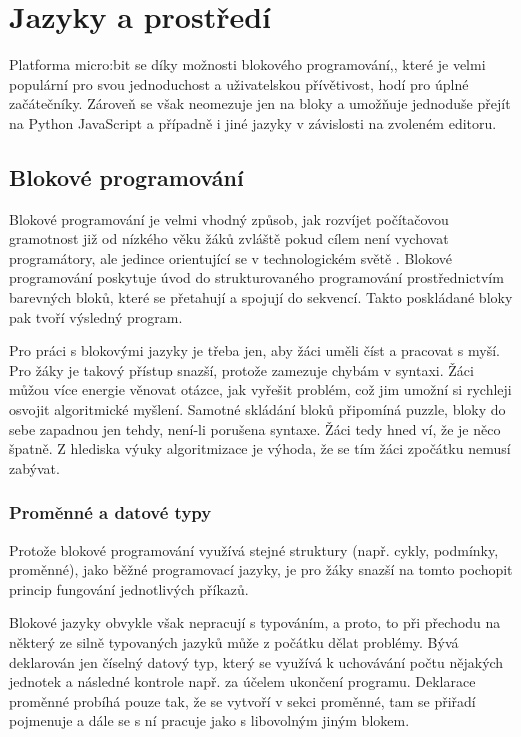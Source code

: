 \documentclass[
  digital,     %
  oneside,     %
  nosansbold,  %
  colorbold, %
  lof,         %
  nolot,         %
]{fithesis4}
\begin{document}
\section{Jazyky a prostředí}
Platforma micro:bit se díky možnosti blokového programování,, které je velmi populární pro svou jednoduchost a uživatelskou přívětivost, hodí pro úplné začátečníky. Zároveň se však neomezuje jen na bloky a umožňuje jednoduše přejít na Python JavaScript a případně i jiné jazyky v závislosti na zvoleném editoru. 

\subsection{Blokové programování}
Blokové programování je velmi vhodný způsob, jak rozvíjet počítačovou gramotnost již od nízkého věku žáků zvláště pokud cílem není vychovat programátory, ale jedince orientující se v technologickém světě \cite{Weintrop19}. Blokové programování poskytuje úvod do strukturovaného programování prostřednictvím barevných bloků, které se přetahují a spojují do sekvencí. Takto poskládané bloky pak tvoří výsledný program.

Pro práci s blokovými jazyky je třeba jen, aby žáci uměli číst a pracovat s myší. Pro žáky je takový přístup snazší, protože zamezuje chybám v syntaxi. Žáci můžou více energie věnovat otázce, jak vyřešit problém, což jim umožní si rychleji osvojit algoritmické myšlení. Samotné skládání bloků připomíná puzzle, bloky do sebe zapadnou jen tehdy, není-li porušena syntaxe. Žáci tedy hned ví, že je něco špatně. Z hlediska výuky algoritmizace je výhoda, že se tím žáci zpočátku nemusí zabývat.

\subsubsection{Proměnné a datové typy}
Protože blokové programování využívá stejné struktury (např. cykly, podmínky, proměnné), jako běžné programovací jazyky, je pro žáky snazší na tomto pochopit princip fungování jednotlivých příkazů. 

Blokové jazyky obvykle však nepracují s typováním, a proto, to při přechodu na některý ze silně typovaných jazyků může z počátku dělat problémy. Bývá deklarován jen číselný datový typ, který se využívá k uchovávání počtu nějakých jednotek a následné kontrole např. za účelem ukončení programu. Deklarace proměnné probíhá pouze tak, že se vytvoří v sekci proměnné, tam se přiřadí pojmenuje a dále se s ní pracuje jako s libovolným jiným blokem.
\end{document}
